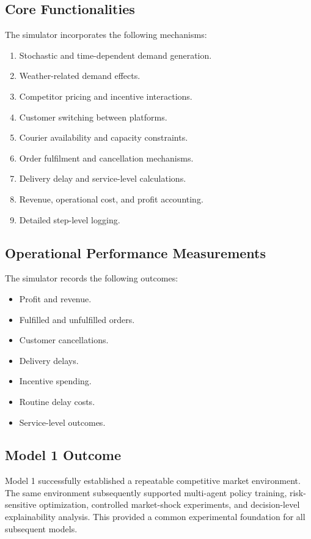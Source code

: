 \documentclass[conference]{IEEEtran}
\begin{document}
\subsection{Core Functionalities}
The simulator incorporates the following mechanisms:
\begin{enumerate}
  \item Stochastic and time-dependent demand generation.
  \item Weather-related demand effects.
  \item Competitor pricing and incentive interactions.
  \item Customer switching between platforms.
  \item Courier availability and capacity constraints.
  \item Order fulfilment and cancellation mechanisms.
  \item Delivery delay and service-level calculations.
  \item Revenue, operational cost, and profit accounting.
  \item Detailed step-level logging.
\end{enumerate}

\subsection{Operational Performance Measurements}
The simulator records the following outcomes:
\begin{itemize}
  \item Profit and revenue.
  \item Fulfilled and unfulfilled orders.
  \item Customer cancellations.
  \item Delivery delays.
  \item Incentive spending.
  \item Routine delay costs.
  \item Service-level outcomes.
\end{itemize}

\subsection{Model 1 Outcome}
Model 1 successfully established a repeatable competitive market environment. The same environment subsequently supported multi-agent policy training, risk-sensitive optimization, controlled market-shock experiments, and decision-level explainability analysis. This provided a common experimental foundation for all subsequent models.
\end{document}
